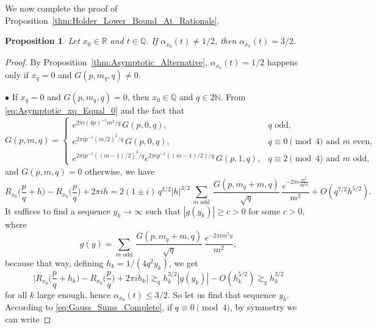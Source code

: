 \documentclass[11pt,reqno]{amsart}
\newtheorem{prop}[thm]{Proposition}
\theoremstyle{definition}
\begin{document}
We now complete the proof of Proposition~\ref{thm:Holder_Lower_Bound_At_Rationals}.
\begin{prop}\label{thm:Rationals32}
Let $x_0 \in \mathbb R$ and $t \in \mathbb Q$. 
If $\alpha_{x_0}(t) \neq 1/2$, then $\alpha_{x_0}(t) = 3/2 $. 
\end{prop}
\begin{proof}
By Proposition~\ref{thm:Asymptotic_Alternative}, 
$\alpha_{x_0}(t) = 1/2$ happens only if $x_q = 0$ and $G(p,m_q,q) \neq 0$. 

$\bullet$ If $x_q = 0$ and $G(p,m_q,q) = 0$, then $x_0 \in \mathbb Q$ and $q \in 2\mathbb N$.  
From \eqref{eq:Asymptotic_xq_Equal_0}
and the fact that
\begin{equation}\label{eq:Gauss_Sums_Complete}
G(p,m,q) = \left\{ 
\begin{array}{ll}
e^{2\pi i (4p)^{-1} m^2/q} \, G(p,0,q), & q \text{ odd,}\\
e^{2\pi i p^{-1} (m/2)^2/q} \,  G(p,0,q), & q \equiv 0 \pmod{4} \text{ and } m \text{ even}, \\
e^{2\pi i p^{-1} ((m-1)/2)^2/q} e^{2\pi i p^{-1} ((m-1)/2)/q} \, G(p,1,q), & q \equiv 2 \pmod{4} \text{ and } m \text{ odd}, 
\end{array}
\right.
\end{equation}
and $G(p,m,q) = 0$ otherwise, we have 
\begin{equation}\label{eq:Extra_Rationals_xq_0}
R_{x_0}\Big( \frac{p}{q} + h \Big) - R_{x_0}\Big( \frac{p}{q} \Big) + 2\pi i h  
= 2(1 \pm i)\, q^{3/2} |h|^{3/2} \,\sum_{m \text{ odd}} \, \frac{ G(p,m_q + m,q)}{\sqrt{q}} \,  \frac{e^{- 2\pi i \frac{m^2}{4 q^2 h}}}{ m^2}
 + O\left( q^{7/2} h^{5/2}  \right).
\end{equation}
It suffices to find a sequence $y_k \to \infty$ such that $|g(y_k)| \geq c > 0$ for some $c > 0$, where
\begin{equation}
g(y) = \sum_{m \text{ odd}} \, \frac{ G(p,m_q + m,q)}{\sqrt{q}} \,  \frac{e^{- 2\pi i m^2 y}}{ m^2},
\end{equation}
because that way, defining $h_k = 1/(4q^2 y_k)$, we get 
\begin{equation}
\Big| R_{x_0}\Big( \frac{p}{q} + h_k \Big) - R_{x_0}\Big( \frac{p}{q} \Big) + 2\pi i h_k \Big|
 \gtrsim_q h_k^{3/2} |g(y_k)| - O(h_k^{5/2}) 
\gtrsim_q h_k^{3/2}
\end{equation}
for all $k$ large enough, hence $\alpha_{x_0}(t) \leq 3/2$. 
So let us find that sequence $y_k$. 
According to \eqref{eq:Gauss_Sums_Complete},  
if $q \equiv 0 \pmod{4}$, by symmetry we can write

\end{proof}
\end{document}
